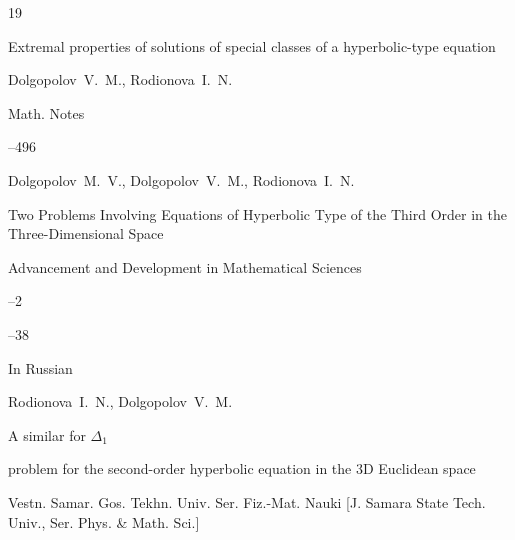 \begin{thebibliography}{19}






\paper Extremal properties of solutions of special classes of a hyperbolic-type equation

\by Dolgopolov~V.~M., Rodionova~I.~N.

\jour Math. Notes




--496







\by Dolgopolov~M.~V., Dolgopolov~V.~M., Rodionova~I.~N.

\paper Two Problems Involving Equations of Hyperbolic Type of the Third Order in the Three-Dimensional Space

\jour Advancement and Development in Mathematical Sciences



--2

--38




\lang In Russian

\by Rodionova~I.~N., Dolgopolov~V.~M.

\paper A similar for $\Delta_1$

problem for the second-order hyperbolic equation in the 3D Euclidean space

\jour Vestn. Samar. Gos. Tekhn. Univ. Ser. Fiz.-Mat. Nauki \rm [J. Samara State Tech. Univ., Ser. Phys. \& Math. Sci.]


\end{thebibliography}
